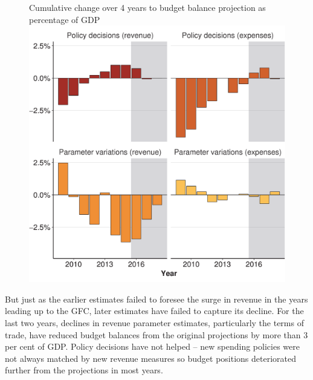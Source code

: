 \documentclass[twoside,english]{grattanBudgetRepairb5portrait}
\begin{document}
\begin{figure}
%
{Cumulative change over 4 years to budget balance projection as percentage of GDP}
\includegraphics[width=\linewidth]{Fiscal-challenges/figure/Figure10-wrapped-1.pdf}

\phantom{.}

\vspace{0.10\textheight}\phantom{.}
\end{figure}

But just as the earlier estimates failed to foresee the surge in revenue in the years leading up to the GFC, later estimates have failed to capture its decline. For the last two years, declines in revenue parameter estimates, particularly the terms of trade, have reduced budget balances from the original projections by more than 3 per cent of GDP\@. Policy decisions have not helped – new spending policies were not always matched by new revenue measures so budget positions deteriorated further from the projections in most years. 
\end{document}
